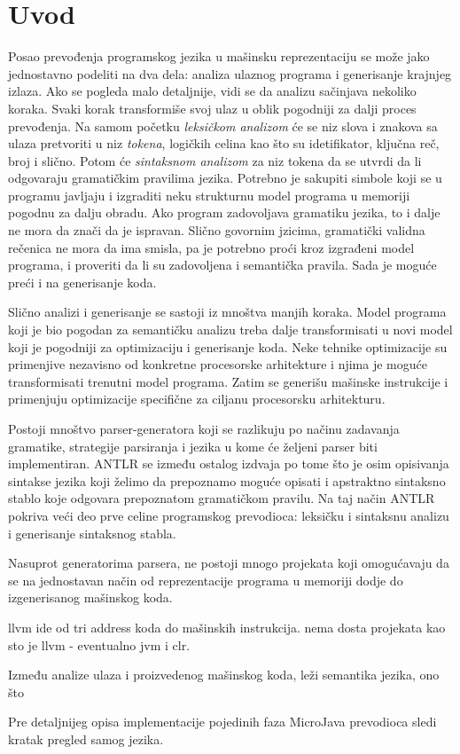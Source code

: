 \chapter{Uvod}

Posao prevođenja programskog jezika u mašinsku reprezentaciju se može jako jednostavno podeliti na dva dela: analiza ulaznog programa i generisanje krajnjeg izlaza\cite{dragon}. 
Ako se pogleda malo detaljnije, vidi se da analizu sačinjava nekoliko koraka. 
Svaki korak transformiše svoj ulaz u oblik pogodniji za dalji proces prevođenja. 
Na samom početku \emph{leksičkom analizom} će se niz slova i znakova sa ulaza pretvoriti u niz \emph{tokena}, logičkih celina kao što su idetifikator, ključna reč, broj i slično. 
Potom će \emph{sintaksnom analizom} za niz tokena da se utvrdi da li odgovaraju gramatičkim pravilima jezika. 
Potrebno je sakupiti simbole koji se u programu javljaju i izgraditi neku strukturnu model programa u memoriji pogodnu za dalju obradu. 
Ako program zadovoljava gramatiku jezika, to i dalje ne mora da znači da je ispravan. 
Slično govornim jzicima, gramatički validna rečenica ne mora da ima smisla, pa je potrebno proći kroz izgrađeni model programa, i proveriti da li su zadovoljena i semantička pravila. 
Sada je moguće preći i na generisanje koda.

Slično analizi i generisanje se sastoji iz mnoštva manjih koraka. 
Model programa koji je bio pogodan za semantičku analizu treba dalje transformisati u novi model koji je pogodniji za optimizaciju i generisanje koda. 
Neke tehnike optimizacije su primenjive nezavisno od konkretne procesorske arhitekture i njima je moguće transformisati trenutni model programa. 
Zatim se generišu mašinske instrukcije i primenjuju optimizacije specifične za ciljanu procesorsku arhitekturu.

Postoji mnoštvo parser-generatora koji se razlikuju po načinu zadavanja gramatike, strategije parsiranja i jezika u kome će željeni parser biti implementiran.
ANTLR se između ostalog izdvaja po tome što je osim opisivanja sintakse jezika koji želimo da prepoznamo moguće opisati i apstraktno sintaksno stablo koje odgovara prepoznatom gramatičkom pravilu. 
Na taj način ANTLR pokriva veći deo prve celine programskog prevodioca: leksičku i sintaksnu analizu i generisanje sintaksnog stabla.

Nasuprot generatorima parsera, ne postoji mnogo projekata koji omogućavaju da se na jednostavan način od reprezentacije programa u memoriji dodje do izgenerisanog mašinskog koda.

llvm ide od tri address koda do mašinskih instrukcija.
nema dosta projekata kao sto je llvm - eventualno jvm i clr.

Između analize ulaza i proizvedenog mašinskog koda, leži semantika jezika, ono što %


Pre detaljnijeg opisa implementacije pojedinih faza MicroJava prevodioca sledi kratak pregled samog jezika. 